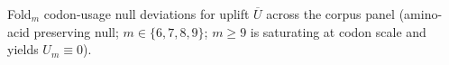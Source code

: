 Fold$_m$ codon-usage null deviations for uplift $\overline{U}$ across the corpus panel (amino-acid preserving null; $m\in\{6,7,8,9\}$; $m\ge 9$ is saturating at codon scale and yields $U_m\equiv 0$).
